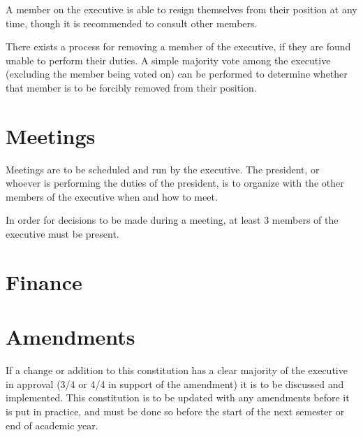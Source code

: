 \documentclass[11pt]{article}
\begin{document}
A member on the executive is able to resign themselves from their position at any time, though it is recommended to consult other members.

\vspace{2mm}
\noindent
There exists a process for removing a member of the executive, if they are found unable to perform their duties. A simple majority vote among the executive (excluding the member being voted on) can be performed to determine whether that member is to be forcibly removed from their position.

\section{Meetings}

Meetings are to be scheduled and run by the executive. The president, or whoever is performing the duties of the president, is to organize with the other members of the executive when and how to meet.

\vspace{2mm}
\noindent
In order for decisions to be made during a meeting, at least 3 members of the executive must be present.

\section{Finance}

\section{Amendments}

If a change or addition to this constitution has a clear majority of the executive in approval (3/4 or 4/4 in support of the amendment) it is to be discussed and implemented. This constitution is to be updated with any amendments before it is put in practice, and must be done so before the start of the next semester or end of academic year.
\end{document}
